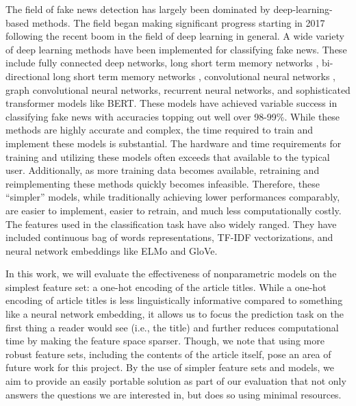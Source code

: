 \documentclass[12pt]{article}
\begin{document}
    The field of fake news detection has largely been dominated by deep-learning-based methods\cite{oshikawa:2020}. The field began making significant progress starting in 2017 following the recent boom in the field of deep learning in general\cite{bhatt:2017}. A wide variety of deep learning methods have been implemented for classifying fake news. These include fully connected deep networks\cite{thota:2018,saikh:2020}, long short term memory networks \cite{rodriguez:2019, kumar:2020}, bi-directional long short term memory networks \cite{popat:2018,qawasmeh:2019,abedalla:2019,kumar:2020}, convolutional neural networks \cite{rodriguez:2019, kumar:2020}, graph convolutional neural networks\cite{monti:2019}, recurrent neural networks\cite{girgis:2018, singhania:2017}, and sophisticated transformer models like BERT\cite{abedalla:2019, zellers:2019}. These models have achieved variable success in classifying fake news with accuracies topping out well over 98-99\%. While these methods are highly accurate and complex, the time required to train and implement these models is substantial. The hardware and time requirements for training and utilizing these models often exceeds that available to the typical user. Additionally, as more training data becomes available, retraining and reimplementing these methods quickly becomes infeasible. Therefore, these ``simpler'' models, while traditionally achieving lower performances comparably\cite{oshikawa:2020}, are easier to implement, easier to retrain, and much less computationally costly. The features used in the classification task have also widely ranged. They have included continuous bag of words representations, TF-IDF vectorizations, and neural network embeddings like ELMo and GloVe. 
    
    In this work, we will evaluate the effectiveness of nonparametric models on the simplest feature set: a one-hot encoding of the article titles. While a one-hot encoding of article titles is less linguistically informative compared to something like a neural network embedding, it allows us to focus the prediction task on the first thing a reader would see (i.e., the title) and further reduces computational time by making the feature space sparser. Though, we note that using more robust feature sets, including the contents of the article itself, pose an area of future work for this project. By the use of simpler feature sets and models, we aim to provide an easily portable solution as part of our evaluation that not only answers the questions we are interested in, but does so using minimal resources.
	
\end{document}
